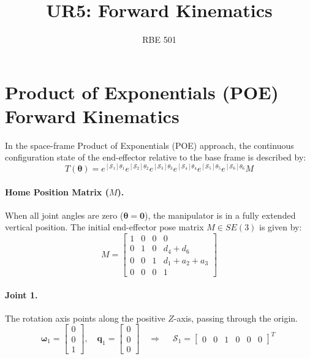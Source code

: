 \documentclass[11pt]{article}
\title{UR5: Forward Kinematics}
\author{RBE 501}
\date{}
\begin{document}
\maketitle

\section{Product of Exponentials (POE) Forward Kinematics}

In the space-frame Product of Exponentials (POE) approach, the continuous configuration state of the end-effector relative to the base frame is described by:
\begin{equation}
  T(\mathbf{\theta}) = e^{[\mathcal{S}_1]\theta_1} e^{[\mathcal{S}_2]\theta_2} e^{[\mathcal{S}_3]\theta_3} e^{[\mathcal{S}_4]\theta_4} e^{[\mathcal{S}_5]\theta_5} e^{[\mathcal{S}_6]\theta_6} M
\end{equation}

\paragraph{Home Position Matrix ($M$).}
When all joint angles are zero ($\mathbf{\theta}=\mathbf{0}$), the manipulator is in a fully extended vertical position. The initial end-effector pose matrix $M \in SE(3)$ is given by:
\begin{equation}
  \boxed{\;
  M = \begin{bmatrix} 1 & 0 & 0 & 0 \\ 0 & 1 & 0 & d_4+d_6 \\ 0 & 0 & 1 & d_1+a_2+a_3 \\ 0 & 0 & 0 & 1 \end{bmatrix}
  \;}
\end{equation}

\paragraph{Joint 1.}
The rotation axis points along the positive $Z$-axis, passing through the origin.
\begin{equation}
  \mathbf{\omega}_1 = \begin{bmatrix} 0 \\ 0 \\ 1 \end{bmatrix}, \quad \mathbf{q}_1 = \begin{bmatrix} 0 \\ 0 \\ 0 \end{bmatrix} \quad \Rightarrow \quad \boxed{\;\mathcal{S}_1 = \begin{bmatrix} 0 & 0 & 1 & 0 & 0 & 0 \end{bmatrix}^T\;}
\end{equation}
\end{document}
